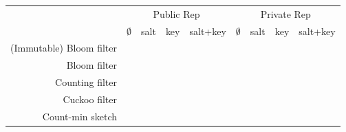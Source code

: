\newcommand{\cellsize}{1cm}
\begin{figure}
\small
\centering
\begin{tabular}{|r | *{4}{m{\cellsize} |} | *{4}{m{\cellsize} |}}\hline
&\multicolumn{4}{c||}{Public Rep} & \multicolumn{4}{c|}{Private Rep} \\
  \cline{2-5}\cline{6-9}
&$\emptyset$ &salt &key &salt+key& $\emptyset$ &salt &key &salt+key\\ \hline
(Immutable) Bloom filter & & & & & & & & \\ \hline
Bloom filter & & & & & & & & \\ \hline
Counting filter  & & & & & & & & \\ \hline
Cuckoo filter & & & & & & & & \\ \hline
Count-min sketch & & & & & & & & \\ \hline
\end{tabular}
\caption{}
\label{fig:results-overview}
\end{figure}